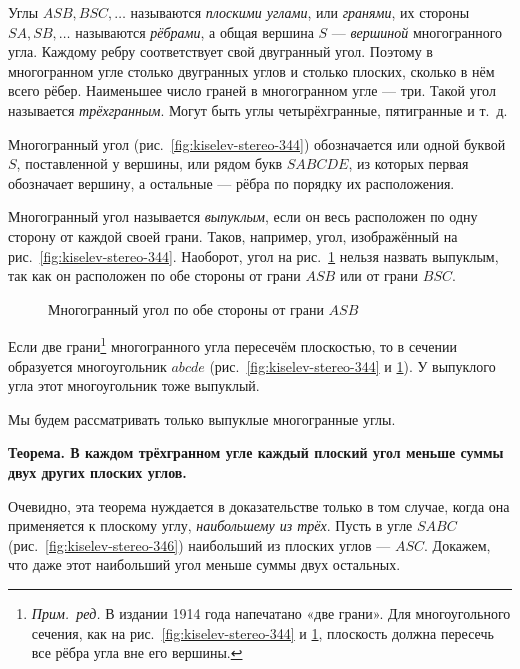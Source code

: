 Углы \(ASB,BSC,\ldots\) называются \emph{плоскими углами}, или \emph{гранями}, их стороны \(SA,SB,\ldots\) называются \emph{рёбрами}, а общая вершина \(S\) --- \emph{вершиной} многогранного угла. Каждому ребру соответствует свой двугранный угол. Поэтому в многогранном угле столько двугранных углов и столько плоских, сколько в нём всего рёбер. Наименьшее число граней в многогранном угле --- три. Такой угол называется \emph{трёхгранным}. Могут быть углы четырёхгранные, пятигранные и т.~д.

Многогранный угол (рис.~\ref{fig:kiselev-stereo-344}) обозначается или одной буквой \(S\), поставленной у вершины, или рядом букв \(SABCDE\), из которых первая обозначает вершину, а остальные --- рёбра по порядку их расположения.

Многогранный угол называется \emph{выпуклым}, если он весь расположен по одну сторону от каждой своей грани. Таков, например, угол, изображённый на рис.~\ref{fig:kiselev-stereo-344}. Наоборот, угол на рис.~\ref{fig:kiselev-stereo-345} нельзя назвать выпуклым, так как он расположен по обе стороны от грани \(ASB\) или от грани \(BSC\).

\begin{figure}[htbp]
    \centering
    \renewcommand{\thefigure}{345}
    \captionsetup{name=Рис.,labelsep=period}
    
    \caption{Многогранный угол по обе стороны от грани \(ASB\)}\label{fig:kiselev-stereo-345}
\end{figure}

Если две грани\footnote{\emph{Прим.~ред.} В издании 1914 года напечатано «две грани». Для многоугольного сечения, как на рис.~\ref{fig:kiselev-stereo-344} и \ref{fig:kiselev-stereo-345}, плоскость должна пересечь все рёбра угла вне его вершины.} многогранного угла пересечём плоскостью, то в сечении образуется многоугольник \(abcde\) (рис.~\ref{fig:kiselev-stereo-344} и \ref{fig:kiselev-stereo-345}). У выпуклого угла этот многоугольник тоже выпуклый.

Мы будем рассматривать только выпуклые многогранные углы.

 \textbf{Теорема. В каждом трёхгранном угле каждый плоский угол меньше суммы двух других плоских углов.}

Очевидно, эта теорема нуждается в доказательстве только в том случае, когда она применяется к плоскому углу,
\emph{наибольшему из трёх}. Пусть в угле \(SABC\) (рис.~\ref{fig:kiselev-stereo-346}) наибольший из плоских углов --- \(ASC\). Докажем, что даже этот наибольший угол меньше суммы двух остальных.

